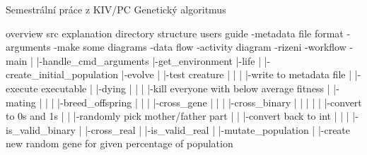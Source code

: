 \documentclass{article}
\begin{document}
  
  Semestrální práce z KIV/PC
  Genetický algoritmus
  
  
  overview
  src explanation
  directory structure
  users guide
  -metadata file format
  -arguments
  -make
  some diagrams
  -data flow
  -activity diagram
  -rizeni
  -workflow
  -main
  |
  |-handle_cmd_arguments
  |-get_environment
  |-life
    |
    |-create_initial_population
    |-evolve
      |
      |-test creature
      | |
      | |-write to metadata file
      | |-execute executable
      |
      |-dying
      | |
      | |-kill everyone with below average fitness
      |  
      |-mating
      | |
      | |-breed_offspring
      |   |
      |   |-cross_gene
      |     |
      |     |-cross_binary
      |     | |
      |     | |-convert to 0s and 1s
      |     | |-randomly pick mother/father part
      |     | |-convert back to int
      |     |
      |     |-is_valid_binary
      |     |-cross_real
      |     |-is_valid_real
      |
      |-mutate_population
        |
        |-create new random gene for given percentage of population
  
    
\end{document}
